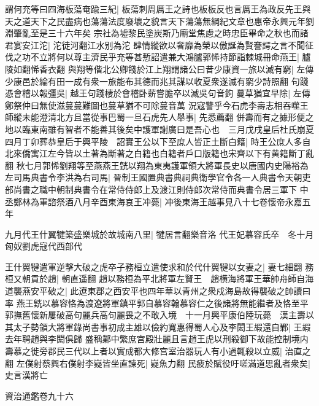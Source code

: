 謂何充等曰四海板蕩奄踰三紀|{
	板蕩刺周厲王之詩也板板反也言厲王為政反先王與天之道天下之民盡病也蕩蕩法度廢壞之貌言天下蕩蕩無綱紀文章也惠帝永興元年劉淵肇亂至是三十六年矣}
宗社為墟黎民塗炭斯乃廟堂焦慮之時忠臣畢命之秋也而諸君宴安江沱|{
	沱徒河翻江水别為沱}
肆情縱欲以奢靡為榮以傲誕為賢謇諤之言不聞征伐之功不立將何以尊主濟民乎充等甚慙詔遣兼大鴻臚郭悕持節詣棘城冊命燕王|{
	臚陵如翻悕香衣翻}
與翔等偕北公卿餞於江上翔謂諸公曰昔少康資一旅以滅有窮|{
	左傳少康邑於綸有田一成有衆一旅能布其德而兆其謀以收夏衆遂滅有窮少詩照翻}
句踐憑會稽以報彊吳|{
	越王句踐棲於會稽卧薪嘗膽卒以滅吳句音鉤}
蔓草猶宜早除|{
	左傳鄭祭仲曰無使滋蔓蔓難圖也蔓草猶不可除蔓音萬}
況寇讐乎今石虎李壽志相吞噬王師縱未能澄清北方且當從事巴蜀一旦石虎先人舉事|{
	先悉薦翻}
併壽而有之據形便之地以臨東南雖有智者不能善其後矣中護軍謝廣曰是吾心也　三月戊戌皇后杜氏崩夏四月丁卯葬恭皇后于興平陵　詔實王公以下至庶人皆正土斷白籍|{
	時王公庶人多自北來僑寓江左今皆以土著為斷著之白籍也白籍者戶口版籍也宋齊以下有黄籍斷丁亂翻}
秋七月郭悕劉翔等至燕燕王皝以翔為東夷護軍領大將軍長史以唐國内史陽裕為左司馬典書令李洪為右司馬|{
	晉制王國置典書典祠典衛學官令各一人典書令天朝吏部尚書之職中朝制典書令在常侍侍郎上及渡江則侍郎次常侍而典書令居三軍下}
中丞鄭林為軍諮祭酒八月辛酉東海哀王冲薨|{
	冲後東海王越事見八十七卷懷帝永嘉五年}


九月代王什翼犍築盛樂城於故城南八里|{
	犍居言翻樂音洛}
代王妃慕容氏卒　冬十月匈奴劉虎寇代西部代

王什翼犍遣軍逆擊大破之虎卒子務桓立遣使求和於代什翼犍以女妻之|{
	妻七細翻}
務桓又朝貢於趙|{
	朝直遥翻}
趙以務桓為平北將軍左賢王　趙横海將軍王華帥舟師自海道襲燕安平破之|{
	此遼東郡之西安平也四年華以青州之衆戍海島故得襲破之帥讀曰率}
燕王皝以慕容恪為渡遼將軍鎮平郭自慕容翰慕容仁之後諸將無能繼者及恪至平郭撫舊懷新屢破高句麗兵高句麗畏之不敢入境　十一月興平康伯陸玩薨　漢主壽以其太子勢領大將軍錄尚書事初成主雄以儉約寬惠得蜀人心及李閎王嘏還自鄴|{
	王嘏去年聘趙與李閎俱歸}
盛稱鄴中繁庶宫殿壯麗且言趙王虎以刑殺御下故能控制境内壽慕之徙旁郡民三代以上者以實成都大修宫室治器玩人有小過輒殺以立威|{
	治直之翻}
左僕射蔡興右僕射李嶷皆坐直諫死|{
	嶷魚力翻}
民疲於賦役吁嗟滿道思亂者衆矣|{
	史言漢將亡}


資治通鑑卷九十六
